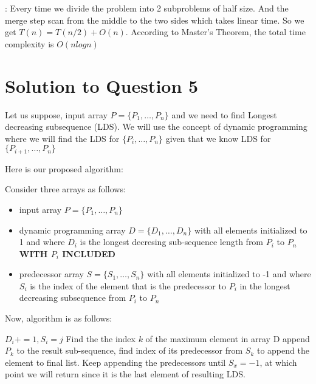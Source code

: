 \documentclass[11pt]{article}
\begin{document}
{{: Every time we divide the problem into 2 subproblems of half size. And the merge step scan from the middle to the two sides which takes linear time. So we get $T(n) = T(n/2) + O(n)$. According to Master's Theorem, the total time complexity is $O(nlogn)$

\section{Solution to Question 5}

Let us suppose, input array $P = \{P_1, \dots, P_n\}$ and we need to find Longest decreasing subsequence (LDS). 
We will use the concept of dynamic programming where we will find the LDS for $\{P_i, \dots, P_n\}$ 
given that we know LDS for $\{P_{i+1}, \dots, P_n\}$

\noindent Here is our proposed algorithm:


\noindent Consider three arrays as follows:

\begin{itemize}
\item input array $P = \{P_1, \dots, P_n\}$
\item dynamic programming array $D = \{D_1, \dots, D_n\}$ with all elements initialized to 1 and
where $D_i$ is the longest decresing sub-sequence length from $P_i$ to $P_n$ {\bf WITH $P_i$ INCLUDED}
\item predecessor array $S = \{S_1, \dots, S_n\}$  with all elements initialized to -1 and
where $S_i$ is the index of the element that is the predecessor to $P_i$ in the longest
decreasing subsequence from $P_i$ to $P_n$
\end{itemize}

\noindent Now, algorithm is as follows:

\begin{algorithm}
\begin{algorithmic}
        \State$D_i += 1, S_i = j$
      \EndIf
    \EndFor
  \EndFor
  \State Find the the index $k$ of the maximum element in array D
  \State append $P_k$ to the result sub-sequence, find index of its predecessor from $S_k$ to append the element to final list. Keep appending the predecessors until $S_x = -1$, at which point we will return since it is the last element of resulting LDS.
\end{algorithmic}
\end{algorithm}

}}
\end{document}
